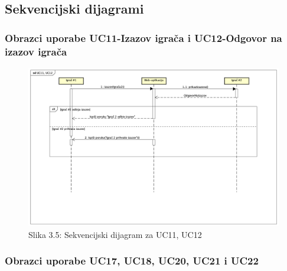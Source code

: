 			\subsection{Sekvencijski dijagrami}
				
				\subsubsection{Obrazci uporabe UC11-Izazov igrača i UC12-Odgovor na izazov igrača}
				
				\begin{figure}[H]
        			\includegraphics[scale=0.4]{slike/Sekvencijski dijagrami/UC11, UC12.png}
        			\centering
        			\caption{Slika 3.5: Sekvencijski dijagram za UC11, UC12}
        			\label{fig:promjene}
        		\end{figure}
				
				\subsubsection{Obrazci uporabe UC17, UC18, UC20, UC21 i UC22}
				

